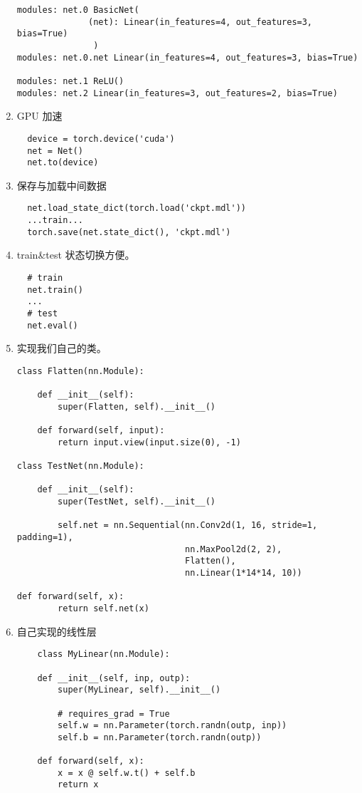 \begin{enumerate}
\begin{lstlisting}
modules: net.0 BasicNet(
              (net): Linear(in_features=4, out_features=3, bias=True)
               )
modules: net.0.net Linear(in_features=4, out_features=3, bias=True)

modules: net.1 ReLU()
modules: net.2 Linear(in_features=3, out_features=2, bias=True)
  \end{lstlisting}
  \item GPU 加速
  \begin{lstlisting}
  device = torch.device('cuda')
  net = Net()
  net.to(device)
  \end{lstlisting}
  
  \item 保存与加载中间数据
  \begin{lstlisting}
  net.load_state_dict(torch.load('ckpt.mdl')) 
  ...train...
  torch.save(net.state_dict(), 'ckpt.mdl') 
  \end{lstlisting}
  
  \item train\&test 状态切换方便。
  \begin{lstlisting}
  # train
  net.train()
  ...
  # test
  net.eval()
  \end{lstlisting}
      \item 实现我们自己的类。
  \begin{lstlisting}
class Flatten(nn.Module):

    def __init__(self):
        super(Flatten, self).__init__()

    def forward(self, input):
        return input.view(input.size(0), -1)

class TestNet(nn.Module):

    def __init__(self):
        super(TestNet, self).__init__()

        self.net = nn.Sequential(nn.Conv2d(1, 16, stride=1, padding=1),
                                 nn.MaxPool2d(2, 2),
                                 Flatten(),
                                 nn.Linear(1*14*14, 10))

def forward(self, x):
        return self.net(x)  
    \end{lstlisting}
    
    \item 自己实现的线性层
    \begin{lstlisting}
    class MyLinear(nn.Module):

    def __init__(self, inp, outp):
        super(MyLinear, self).__init__()

        # requires_grad = True
        self.w = nn.Parameter(torch.randn(outp, inp))
        self.b = nn.Parameter(torch.randn(outp))

    def forward(self, x):
        x = x @ self.w.t() + self.b
        return x
    \end{lstlisting}
    
\end{enumerate}
    


